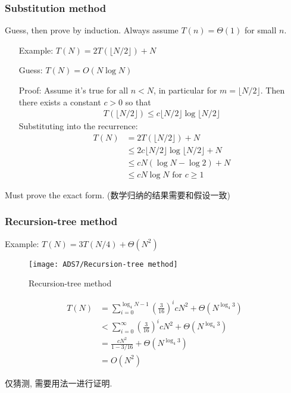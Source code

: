 \subsubsection{Substitution method}
Guess, then prove by induction. Always assume $T( n ) = \Theta ( 1 )$ for small $n$.
\begin{itemize}
    \item [Example:] $T(N)=2T(\lfloor N/2 \rfloor)+N$
    \item [Guess:] $T(N)=O(N\log N)$
    \item [Proof:] Assume it's true for all $n<N$, in particular for $m=\lfloor N/2 \rfloor$.
    \subitem Then there exists a constant $c>0$ so that
    \begin{align*}
        T(\lfloor N/2 \rfloor)\le c\lfloor N/2 \rfloor\log\lfloor N/2 \rfloor
    \end{align*}
    \subitem Substituting into the recurrence:
    \begin{align*}
        T(N)&=2T(\lfloor N/2 \rfloor)+N\\
        &\le 2c\lfloor N/2 \rfloor\log \lfloor N/2 \rfloor+N\\
        &\le cN(\log N-\log 2)+N\\
        &\le cN\log N \text{ for }c\ge 1
    \end{align*}
\end{itemize}
Must prove the exact form. (数学归纳的结果需要和假设一致)

\subsubsection{Recursion-tree method}
Example: $T(N)=3T(N/4)+\Theta (N^2)$
\begin{figure}[!htb]
    \centering
    \texttt{[image: ADS7/Recursion-tree method]}
    \caption{Recursion-tree method}
\end{figure}

\begin{align*}
    T(N)&=\sum_{i=0}^{\log_4 N -1}\left( \frac{3}{16} \right)^i cN^2+\Theta(N^{\log_4 3})\\
    &<\sum_{i=0}^\infty \left( \frac{3}{16} \right)^i cN^2+\Theta(N^{\log_4 3})\\
    &=\frac{cN^2}{1-3/16}+\Theta(N^{\log_4 3})\\
    &=O(N^2)
\end{align*}

仅猜测, 需要用法一进行证明. 

